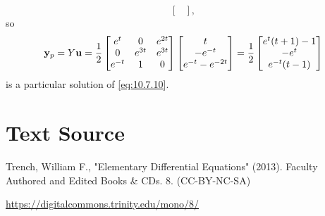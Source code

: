 \documentclass{ximera}
\begin{document}
\begin{example}
\begin{explanation}
$$\begin{bmatrix}
\end{bmatrix},
$$
so
$$
{\bf y}_p=Y{\bf u}=
\frac{1}{2}\begin{bmatrix}e^t&0&e^{2t}\\0&e^{3t}&e^{3t}\\e^{-t}&1&0
\end{bmatrix}
\begin{bmatrix}t\\-e^{-t}\\e^{-t}-e^{-2t}
\end{bmatrix}=\frac{1}{2}\begin{bmatrix}e^t(t+1)-1\\
-e^t\\e^{-t}(t-1)\end{bmatrix}
$$
is a particular solution of  \eqref{eq:10.7.10}.
\end{explanation}
\end{example}




\section*{Text Source}
Trench, William F., "Elementary Differential Equations" (2013). Faculty Authored and Edited Books \& CDs. 8. (CC-BY-NC-SA)

\href{https://digitalcommons.trinity.edu/mono/8/}{https://digitalcommons.trinity.edu/mono/8/}
\end{document}
